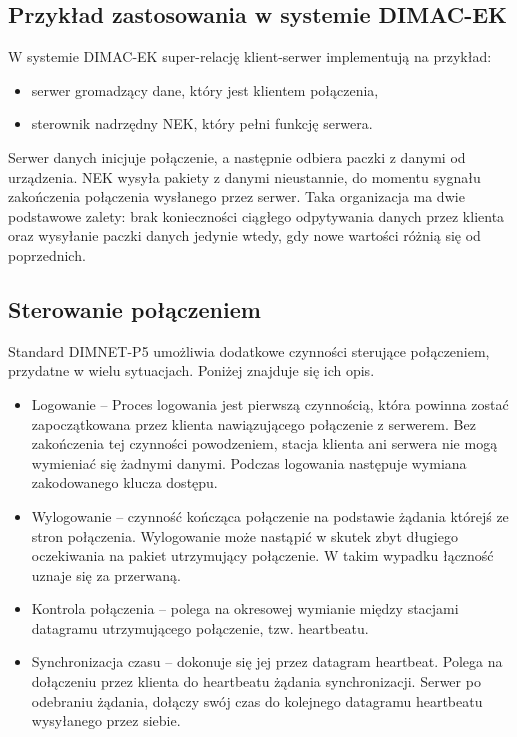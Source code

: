 \subsection{Przykład zastosowania w systemie DIMAC-EK}
W systemie DIMAC-EK super-relację klient-serwer implementują na przykład\cite{dimacek-wytyczne}:
\begin{itemize}
\item serwer gromadzący dane, który jest klientem połączenia,
\item sterownik nadrzędny NEK, który pełni funkcję serwera.
\end{itemize} 
Serwer danych inicjuje połączenie, a następnie odbiera paczki z danymi od urządzenia. NEK wysyła pakiety z danymi nieustannie, do momentu sygnału zakończenia połączenia wysłanego przez serwer. Taka organizacja ma dwie podstawowe zalety: brak konieczności ciągłego odpytywania danych przez klienta oraz wysyłanie paczki danych jedynie wtedy, gdy nowe wartości różnią się od poprzednich.

\subsection{Sterowanie połączeniem}
Standard \mbox{DIMNET-P5} umożliwia dodatkowe czynności sterujące połączeniem, przydatne w wielu sytuacjach. Poniżej znajduje się ich opis.
\begin{itemize}
\item Logowanie -- Proces logowania jest pierwszą czynnością, która powinna zostać zapoczątkowana przez klienta nawiązującego połączenie z serwerem. Bez zakończenia tej czynności powodzeniem, stacja klienta ani serwera nie mogą wymieniać się żadnymi danymi. Podczas logowania następuje wymiana zakodowanego klucza dostępu.
\item Wylogowanie -- czynność kończąca połączenie na podstawie żądania którejś ze stron połączenia. Wylogowanie może nastąpić w skutek zbyt długiego oczekiwania na pakiet utrzymujący połączenie. W takim wypadku łączność uznaje się za przerwaną.
\item Kontrola połączenia -- polega na okresowej wymianie między stacjami datagramu utrzymującego połączenie, tzw. heartbeatu.
\item Synchronizacja czasu -- dokonuje się jej przez datagram heartbeat. Polega na dołączeniu przez klienta do heartbeatu żądania synchronizacji. Serwer po odebraniu żądania, dołączy swój czas do kolejnego datagramu heartbeatu wysyłanego przez siebie.
\end{itemize}



